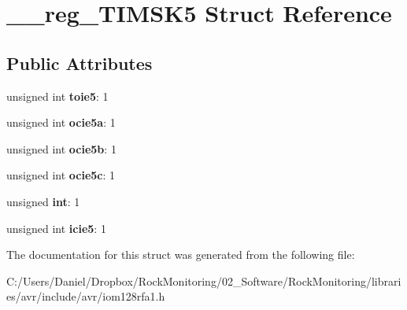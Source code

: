 \hypertarget{struct____reg___t_i_m_s_k5}{}\section{\+\_\+\+\_\+reg\+\_\+\+T\+I\+M\+S\+K5 Struct Reference}
\label{struct____reg___t_i_m_s_k5}
\subsection*{Public Attributes}
\begin{DoxyCompactItemize}
\item 
unsigned int {\bfseries toie5}\+: 1\hypertarget{struct____reg___t_i_m_s_k5_ab400f2bbb829cf2a27749f3e3032071a}{}\label{struct____reg___t_i_m_s_k5_ab400f2bbb829cf2a27749f3e3032071a}

\item 
unsigned int {\bfseries ocie5a}\+: 1\hypertarget{struct____reg___t_i_m_s_k5_a69ca3724745bd3dba8ad8eedae21f993}{}\label{struct____reg___t_i_m_s_k5_a69ca3724745bd3dba8ad8eedae21f993}

\item 
unsigned int {\bfseries ocie5b}\+: 1\hypertarget{struct____reg___t_i_m_s_k5_a4050ff45ccda6ca1cd8de0b76c37ad4c}{}\label{struct____reg___t_i_m_s_k5_a4050ff45ccda6ca1cd8de0b76c37ad4c}

\item 
unsigned int {\bfseries ocie5c}\+: 1\hypertarget{struct____reg___t_i_m_s_k5_aaf13d596596d4e2a50b84021e7bff43b}{}\label{struct____reg___t_i_m_s_k5_aaf13d596596d4e2a50b84021e7bff43b}

\item 
unsigned {\bfseries int}\+: 1\hypertarget{struct____reg___t_i_m_s_k5_aac97b9a90be005cbcbe3b3536ead73ee}{}\label{struct____reg___t_i_m_s_k5_aac97b9a90be005cbcbe3b3536ead73ee}

\item 
unsigned int {\bfseries icie5}\+: 1\hypertarget{struct____reg___t_i_m_s_k5_aaedcd131c320a2370862786f3763c33e}{}\label{struct____reg___t_i_m_s_k5_aaedcd131c320a2370862786f3763c33e}

\end{DoxyCompactItemize}


The documentation for this struct was generated from the following file\+:\begin{DoxyCompactItemize}
\item 
C\+:/\+Users/\+Daniel/\+Dropbox/\+Rock\+Monitoring/02\+\_\+\+Software/\+Rock\+Monitoring/libraries/avr/include/avr/iom128rfa1.\+h\end{DoxyCompactItemize}
